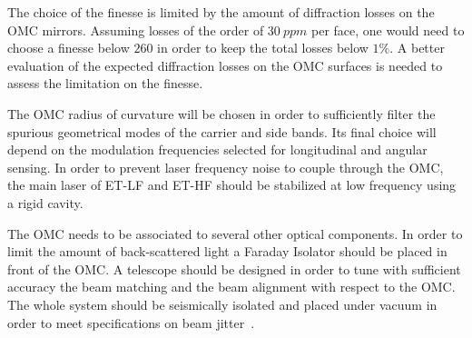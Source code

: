 The choice of the finesse is limited by the amount of diffraction losses on the OMC mirrors. Assuming losses of the order of $30~ppm$ 
per face, one would need to choose a finesse below $260$ in order to keep the total losses below $1\%$. A better evaluation of the 
expected diffraction losses on the OMC surfaces is needed to assess the limitation on the finesse.

The OMC radius of curvature will be chosen in order to sufficiently filter the spurious geometrical modes of the carrier and side bands. 
Its final choice will depend on the modulation frequencies selected for longitudinal and angular sensing.
In order to prevent laser frequency noise to couple through the OMC, the main laser of ET-LF and ET-HF should be stabilized at low 
frequency using a rigid cavity.

The OMC needs to be associated to several other optical components. In order to limit the amount of back-scattered light a Faraday 
Isolator should be placed in front of the OMC. A telescope should be designed in order to tune with sufficient accuracy the beam matching
 and the beam alignment with respect to the OMC. The whole system should be seismically isolated and placed under vacuum in order to
  meet specifications on beam jitter~\cite{VIR-0054A-11}.
  
  